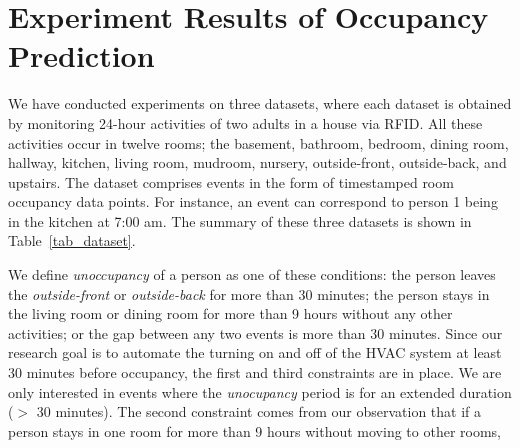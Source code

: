 \section{Experiment Results of Occupancy Prediction}
We have conducted experiments on three datasets, where each dataset is obtained by monitoring 24-hour activities of two adults in a house via RFID. 
All these activities occur in twelve rooms; the basement, bathroom, bedroom, dining room, hallway, kitchen, living room, mudroom, nursery, outside-front, outside-back, and upstairs. 
The dataset comprises events in the form of timestamped room occupancy data points. For instance, an event can correspond to person 1 being in the kitchen at 7:00 am. The summary of these three datasets is shown in Table~\ref{tab_dataset}. 
\begin{table}[h]
\centering
\end{table}
We define \textit{unoccupancy} of a person as one of these conditions: the person leaves the {\em outside-front} or {\em outside-back} for more than 30 minutes; the person stays in the living room or dining room for more than 9 hours without any other activities; or the gap between any two events is more than 30 minutes. 
Since our research goal is to automate the turning on and off of the HVAC system at least 30 minutes before occupancy, the first and third constraints are in place. We are only interested in events where the {\em unocupancy} period is for an extended duration ($>$ 30 minutes). The second constraint comes from our observation that if a person stays in one room for more than 9 hours without moving to other rooms, 
